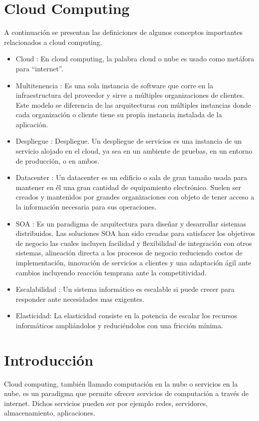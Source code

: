 

\section{Cloud Computing}
A continuación se presentan las definiciones de algunos conceptos importantes relacionados a cloud computing.
\begin{itemize}
    \item Cloud : En cloud computing, la palabra cloud o nube es usado como metáfora para “internet”.
    \item Multitenencia : Es una sola instancia de software que corre en la infraestructura del proveedor y sirve a múltiples organizaciones de clientes. Este modelo se diferencia de las arquitecturas con múltiples instancias donde cada organización o cliente tiene su propia instancia instalada de la aplicación.
    \item Despliegue : Despliegue. Un despliegue de servicios es una instancia de un servicio alojado en el cloud, ya sea en un ambiente de pruebas, en un entorno de producción, o en ambos.
    \item Datacenter : Un datacenter es un edificio o sala de gran tamaño usada para mantener en él una gran cantidad de equipamiento electrónico. Suelen ser creados y mantenidos por grandes organizaciones con objeto de tener acceso a la información necesaria para sus operaciones.
    \item SOA : Es un paradigma de arquitectura para diseñar y desarrollar sistemas distribuidos. Las soluciones  SOA  han sido creadas para satisfacer los objetivos de negocio las cuales incluyen facilidad y flexibilidad de integración con otros sistemas, alineación directa a los procesos de negocio reduciendo costos de implementación, innovación de servicios a clientes y una adaptación ágil ante cambios incluyendo reacción temprana ante la competitividad.
    \item Escalabilidad : Un sistema informático es escalable si puede crecer para responder ante necesidades mas exigentes.
    \item Elasticidad: La elasticidad consiste en la potencia de escalar los
          recursos informáticos ampliándolos y reduciéndolos con una fricción mínima.
\end{itemize}


\section{Introducción}
Cloud computing, también llamado computación en la nube o servicios en la nube, es un paradigma que permite ofrecer servicios de computación a través de internet. Dichos servicios pueden ser por ejemplo redes, servidores, almacenamiento, aplicaciones.

